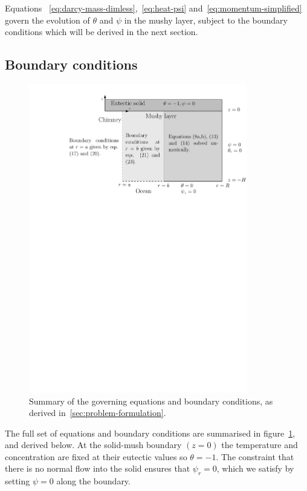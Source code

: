 \documentclass[11pt,twocolumn]{article}
\makeatletter
\newcommand{\squeezeup}{\vspace{-5mm}}
\newcommand{\specialeqref}[2]{\begingroup
  \def\tagform@##1{\maketag@@@{(\ignorespaces##1\unskip\@@italiccorr#2)}}%
  \eqref{#1}\endgroup}
\makeatother
\begin{document}
Equations~\specialeqref{eq:darcy-mass-dimless}{a,b},~\eqref{eq:heat-psi} and~\eqref{eq:momentum-simplified} govern the evolution of $\theta$ and $\psi$ in the mushy layer, subject to the boundary conditions which will be derived in the next section.

\subsection{Boundary conditions}
\begin{figure}[ht!]
    \centering 
    \squeezeup
       \includegraphics[width=0.85\textwidth]{boundary-conditions}
       
       \setlength{\belowcaptionskip}{-10pt} %
       
       \caption{Summary of the governing equations and boundary conditions, as derived in~\autoref{sec:problem-formulation}.}
    \label{fig:boundary-conditions}
\end{figure}


The full set of equations and boundary conditions are summarised in figure~\ref{fig:boundary-conditions}, and derived below. At the solid-mush boundary $(z=0)$ the temperature and concentration are fixed at their eutectic values so $\theta = -1$. The constraint that there is no normal flow into the solid ensures that $\psi_r = 0$, which we satisfy by setting $\psi = 0$ along the boundary.
\end{document}

